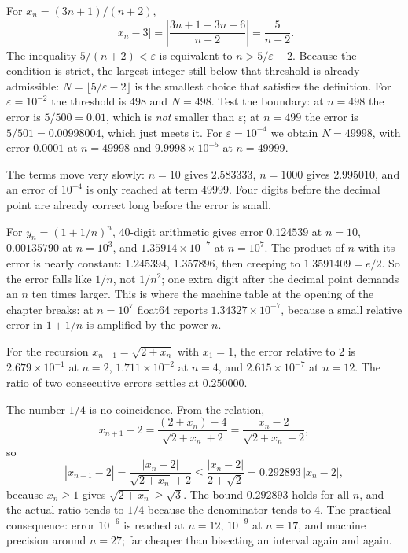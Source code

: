 For $x_n=(3n+1)/(n+2)$,
\[
|x_n-3| = \left|\frac{3n+1-3n-6}{n+2}\right| = \frac{5}{n+2}.
\]
The inequality $5/(n+2)<\varepsilon$ is equivalent to $n>5/\varepsilon-2$. Because the
condition is strict, the largest integer still below that threshold is already
admissible: $N=\lfloor 5/\varepsilon-2 \rfloor$ is the smallest choice that satisfies the
definition. For $\varepsilon=10^{-2}$ the threshold is $498$ and $N=498$. Test the
boundary: at $n=498$ the error is $5/500=0.01$, which is \emph{not} smaller than
$\varepsilon$; at $n=499$ the error is $5/501=0.00998004$, which just meets it. For
$\varepsilon=10^{-4}$ we obtain $N=49998$, with error $0.0001$ at $n=49998$ and
$9.9998 \times 10^{-5}$ at $n=49999$.

The terms move very slowly: $n=10$ gives $2.583333$, $n=1000$ gives $2.995010$, and an
error of $10^{-4}$ is only reached at term $49999$. Four digits before the decimal point
are already correct long before the error is small.


For $y_n=(1+1/n)^n$, 40-digit arithmetic gives error $0.124539$ at $n=10$, $0.00135790$
at $n=10^3$, and $1.35914 \times 10^{-7}$ at $n=10^7$. The product of $n$ with its error
is nearly constant: $1.245394$, $1.357896$, then creeping to $1.3591409 = e/2$. So the
error falls like $1/n$, not $1/n^2$; one extra digit after the decimal point demands an
$n$ ten times larger. This is where the machine table at the opening of the chapter
breaks: at $n=10^7$ float64 reports $1.34327 \times 10^{-7}$, because a small relative
error in $1+1/n$ is amplified by the power $n$.

For the recursion $x_{n+1}=\sqrt{2+x_n}$ with $x_1=1$, the error relative to $2$ is
$2.679 \times 10^{-1}$ at $n=2$, $1.711 \times 10^{-2}$ at $n=4$, and
$2.615 \times 10^{-7}$ at $n=12$. The ratio of two consecutive errors settles at
$0.250000$.

The number $1/4$ is no coincidence. From the relation,
\[
x_{n+1}-2 = \frac{(2+x_n)-4}{\sqrt{2+x_n}+2}
= \frac{x_n-2}{\sqrt{2+x_n}+2},
\]
so
\[
|x_{n+1}-2| = \frac{|x_n-2|}{\sqrt{2+x_n}+2}
\le \frac{|x_n-2|}{2+\sqrt{2}} = 0.292893\,|x_n-2| ,
\]
because $x_n \ge 1$ gives $\sqrt{2+x_n} \ge \sqrt{3}$. The bound $0.292893$ holds for
all $n$, and the actual ratio tends to $1/4$ because the denominator tends to $4$. The
practical consequence: error $10^{-6}$ is reached at $n=12$, $10^{-9}$ at $n=17$, and
machine precision around $n=27$; far cheaper than bisecting an interval again and again.

